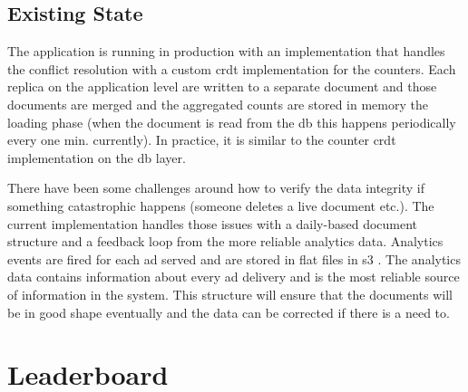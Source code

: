 \documentclass[11pt,a4paper]{report}
\begin{document}
\subsection{Existing State}
The application is running in production with an implementation that handles the conflict resolution with a custom \gls{crdt} implementation for the counters. Each replica on the application level are written to a separate document and those documents are merged and the aggregated counts are stored in memory the loading phase (when the document is read from the \gls{db} this happens periodically every one min. currently). In practice, it is similar to the counter \gls{crdt} implementation on the \gls{db} layer.

There have been some challenges around how to verify the data integrity if something catastrophic happens (someone deletes a live document etc.). The current implementation handles those issues with a daily-based document structure and a feedback loop from the more reliable analytics data. Analytics events are fired for each ad served and are stored in flat files in s3 . The analytics data contains information about every ad delivery and is the most reliable source of information in the system. This structure will ensure that the documents will be in good shape eventually and the data can be corrected if there is a need to.



\section{Leaderboard}
\end{document}

